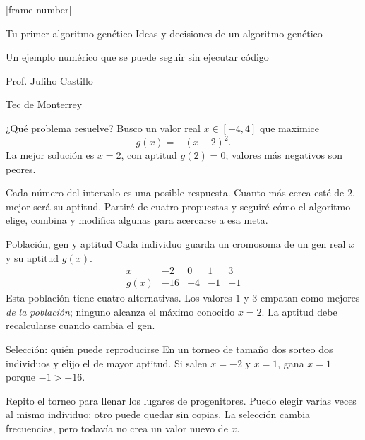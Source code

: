 
[frame number]
\date{}


\begin{frame}{Tu primer algoritmo genético}
\centering\Large Ideas y decisiones de un algoritmo genético
\par\vspace{1em}\normalsize Un ejemplo numérico que se puede seguir sin ejecutar código
\par\vspace{1em}Prof. Juliho Castillo\par Tec de Monterrey
\end{frame}

\begin{frame}{¿Qué problema resuelve?}
Busco un valor real $x\in[-4,4]$ que maximice
\[
g(x)=-(x-2)^2.
\]
La mejor solución es $x=2$, con aptitud $g(2)=0$; valores más negativos son peores.
\medskip

Cada número del intervalo es una posible respuesta. Cuanto más cerca esté de
$2$, mejor será su aptitud. Partiré de cuatro propuestas y seguiré cómo el
algoritmo elige, combina y modifica algunas para acercarse a esa meta.
\end{frame}

\begin{frame}{Población, gen y aptitud}
Cada individuo guarda un cromosoma de un gen real $x$ y su aptitud $g(x)$.
\[
\begin{array}{c|rrrr}
x & -2 & 0 & 1 & 3\\ \hline
g(x) & -16 & -4 & -1 & -1
\end{array}
\]
Esta población tiene cuatro alternativas. Los valores $1$ y $3$ empatan
como mejores \emph{de la población}; ninguno alcanza el máximo conocido $x=2$.
La aptitud debe recalcularse cuando cambia el gen.
\end{frame}

\begin{frame}{Selección: quién puede reproducirse}
En un torneo de tamaño dos sorteo dos individuos y elijo el de mayor aptitud.
Si salen $x=-2$ y $x=1$, gana $x=1$ porque $-1>-16$.
\medskip

Repito el torneo para llenar los lugares de progenitores. Puedo elegir varias
veces al mismo individuo; otro puede quedar sin copias. La selección cambia
frecuencias, pero todavía no crea un valor nuevo de $x$.
\end{frame}

